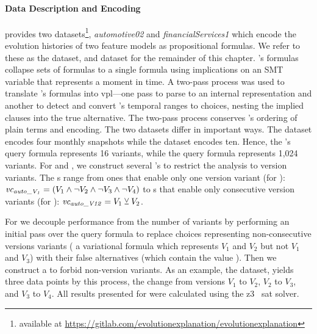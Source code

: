 \paragraph{Data Description and Encoding}%
\label{sec:exper:description}
\nieke{} provides two datasets\footnote{available at
  \url{https://gitlab.com/evolutionexplanation/evolutionexplanation}},
\textit{automotive02} and \textit{financialServices1} which encode the evolution
histories of two feature models as propositional formulas.
% 
% 
We refer to these as the \auto{} dataset, and \fin{} dataset for the
remainder of this chapter.
% 
%
\nieke{}'s formulas collapse sets of \pl{} formulas to a single formula using
implications on an SMT variable that represents a moment in time. A two-pass
process was used to translate \nieke{}'s formulas into \ac{vpl}---one pass to
parse to an internal representation and another to detect and convert \nieke{}'s
temporal ranges to choices, nesting the implied clauses into the true
alternative. The two-pass process conserves \nieke{}'s ordering of plain terms
and encoding. The two datasets differ in important ways. The \auto{} dataset
encodes four monthly snapshots while the \fin{} dataset encodes ten. Hence, the
\auto{}'s query formula represents 16 variants, while the \fin{} query formula
represents 1,024 variants. For  and , we construct several
\vc{}'s to restrict the analysis to version variants. The \vc{}s range from ones
that enable only one version variant (for ): $\mathit{vc_{\mathit{auto\_V_{1}}}}
= (V_{1} \wedge \neg V_{2} \wedge \neg V_{3} \wedge \neg V_{4})$ to \vc{}s that
enable only consecutive version variants (for ):
$\mathit{vc_{\mathit{auto\_V12}}} = V_{1} \veebar V_{2}$.

For  we decouple performance from the number of variants by performing
an initial pass over the query formula to replace choices representing
non-consecutive versions variants (\eg{} a variational formula which represents
$V_{1}$ and $V_{2}$ but not $V_{1}$ and $V_{3}$) with their false alternatives
(which contain the value \tru{}). Then we construct a \vc{} to forbid
non-version variants. As an example, the \auto{} dataset, yields three data
points by this process, the change from versions $V_{1}$ to $V_{2}$, $V_{2}$ to
$V_{3}$, and $V_{3}$ to $V_{4}$. All results presented for  were
  calculated using the z3~{\citep{10.1007/978-3-540-78800-3_24}} \ac{sat}
  solver.

